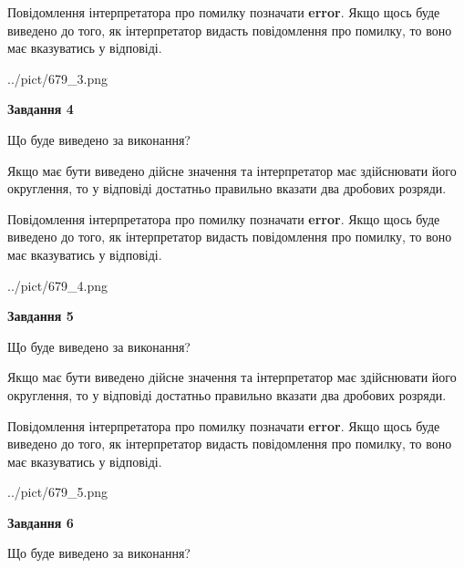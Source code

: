 \documentclass[12pt, ukrainian]{article}
\begin{document}
{\begin {Large}
Повідомлення інтерпретатора про помилку позначати \textbf{error}.
Якщо щось буде виведено до того, як інтерпретатор видасть повідомлення про помилку, 
то воно має вказуватись у відповіді. \par

\begin{center}
	{../pict/679_3.png}
\end{center}
\newpage

{\begin {center}\textbf{Завдання 4}\end {center}}\par
Що буде виведено за виконання? \par

Якщо має бути виведено дійсне значення та інтерпретатор має здійснювати його округлення, 
то у відповіді достатньо правильно вказати два дробових розряди.

Повідомлення інтерпретатора про помилку позначати \textbf{error}.
Якщо щось буде виведено до того, як інтерпретатор видасть повідомлення про помилку, 
то воно має вказуватись у відповіді. \par

\begin{center}
	{../pict/679_4.png}
\end{center}
\newpage

{\begin {center}\textbf{Завдання 5}\end {center}}\par
Що буде виведено за виконання? \par

Якщо має бути виведено дійсне значення та інтерпретатор має здійснювати його округлення, 
то у відповіді достатньо правильно вказати два дробових розряди.

Повідомлення інтерпретатора про помилку позначати \textbf{error}.
Якщо щось буде виведено до того, як інтерпретатор видасть повідомлення про помилку, 
то воно має вказуватись у відповіді. \par

\begin{center}
	{../pict/679_5.png}
\end{center}
\newpage

{\begin {center}\textbf{Завдання 6}\end {center}}\par
Що буде виведено за виконання? \par


\end{Large}}
\end{document}
